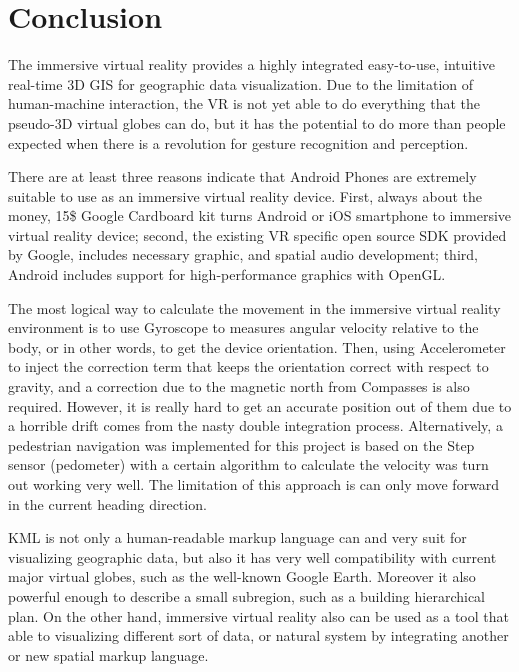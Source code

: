 \label{chapter-conclusion}
\chapter{Conclusion}

The immersive virtual reality provides a highly integrated easy-to-use, intuitive real-time 3D GIS for geographic data visualization. Due to the limitation of human-machine interaction, the VR is not yet able to do everything that the pseudo-3D virtual globes can do, but it has the potential to do more than people expected when there is a revolution for gesture recognition and perception.

There are at least three reasons indicate that Android Phones are extremely suitable to use as an immersive virtual reality device. First, always about the money, 15\$ Google Cardboard kit turns Android or iOS smartphone to immersive virtual reality device; second, the existing VR specific open source SDK provided by Google, includes necessary graphic, and spatial audio development; third, Android includes support for high-performance graphics with OpenGL.

The most logical way to calculate the movement in the immersive virtual reality environment is to use Gyroscope to measures angular velocity relative to the body, or in other words, to get the device orientation.
Then, using Accelerometer to inject the correction term that keeps the orientation correct with respect to gravity, and a correction due to the magnetic north from Compasses is also required. However, it is really hard to get an accurate position out of them due to a horrible drift comes from the nasty double integration process. Alternatively, a pedestrian navigation was implemented for this project is based on the Step sensor (pedometer) with a certain algorithm to calculate the velocity was turn out working very well. The limitation of this approach is can only move forward in the current heading direction.

KML is not only a human-readable markup language can and very suit for visualizing geographic data, but also it has very well compatibility with current major virtual globes, such as the well-known Google Earth. Moreover it also powerful enough to describe a small subregion, such as a building hierarchical plan. On the other hand, immersive virtual reality also can be used as a tool that able to visualizing different sort of data, or natural system by integrating another or new spatial markup language.

